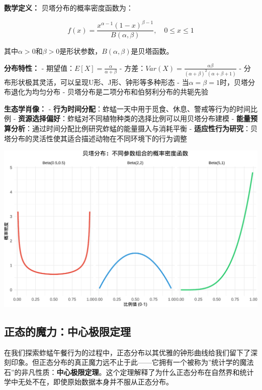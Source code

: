 \documentclass[
]{book}
\begin{document}
\textbf{数学定义：} 贝塔分布的概率密度函数为：

\[f(x) = \frac{x^{\alpha-1}(1-x)^{\beta-1}}{B(\alpha, \beta)}, \quad 0 \leq x \leq 1\]

其中\(\alpha > 0\)和\(\beta > 0\)是形状参数，\(B(\alpha, \beta)\)是贝塔函数。

\textbf{分布特性：}
- 期望值：\(E[X] = \frac{\alpha}{\alpha + \beta}\)
- 方差：\(Var(X) = \frac{\alpha\beta}{(\alpha+\beta)^2(\alpha+\beta+1)}\)
- 分布形状极其灵活，可以呈现U形、J形、钟形等多种形态
- 当\(\alpha = \beta = 1\)时，贝塔分布退化为均匀分布
- 贝塔分布是二项分布和伯努利分布的共轭先验

\textbf{生态学肖像：}
- \textbf{行为时间分配}：蚱蜢一天中用于觅食、休息、警戒等行为的时间比例
- \textbf{资源选择偏好}：蚱蜢对不同植物种类的选择比例可以用贝塔分布建模
- \textbf{能量预算分析}：通过时间分配比例研究蚱蜢的能量摄入与消耗平衡
- \textbf{适应性行为研究}：贝塔分布的灵活性使其适合描述动物在不同环境下的行为调整

\begin{center}\includegraphics[width=0.8\linewidth]{ecological-statistics_files/figure-latex/unnamed-chunk-31-1} \end{center}

\hypertarget{ux6b63ux6001ux7684ux9b54ux529bux4e2dux5fc3ux6781ux9650ux5b9aux7406}{%
\subsection{正态的魔力：中心极限定理}\label{ux6b63ux6001ux7684ux9b54ux529bux4e2dux5fc3ux6781ux9650ux5b9aux7406}}

在我们探索蚱蜢午餐行为的过程中，正态分布以其优雅的钟形曲线给我们留下了深刻印象。但正态分布的真正魔力远不止于此------它拥有一个被称为''统计学的魔法石''的非凡性质：\textbf{中心极限定理}。这个定理解释了为什么正态分布在自然界和统计学中无处不在，即使原始数据本身并不服从正态分布。
\end{document}
